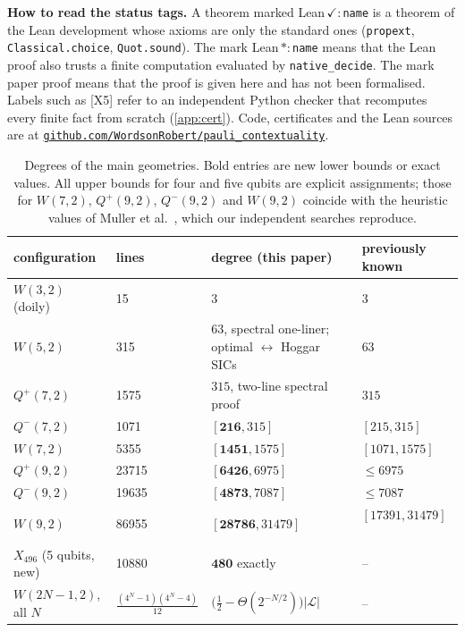 \documentclass[a4paper,onecolumn,11pt,unpublished,nopdfoutputerror]{quantumarticle}
\theoremstyle{definition}
\newcommand{\cert}[1]{\textcolor{certblue}{\textsf{[#1]}}}
\newcommand{\ding}{\ensuremath{\checkmark}}
\newcommand{\Lines}{\mathcal{L}}
\newcommand{\W}[1]{W(#1,2)}
\newcommand{\Qp}[1]{Q^{+}(#1,2)}
\newcommand{\Qm}[1]{Q^{-}(#1,2)}
\newcommand{\repourl}{https://github.com/WordsonRobert/pauli_contextuality}
\newcommand{\repo}{\href{\repourl}{\nolinkurl{github.com/WordsonRobert/pauli_contextuality}}}
\begin{document}
\begin{summarybox}
\textbf{How to read the status tags.} A theorem marked \textcolor{leangreen}{\textsf{Lean\,\ding:}\,\texttt{name}}
is a theorem of the Lean development whose axioms are only the standard ones (\texttt{propext},
\texttt{Classical.choice}, \texttt{Quot.sound}). The mark \textcolor{leangreen}{\textsf{Lean\,$\ast$:}\,\texttt{name}}
means that the Lean proof also trusts a finite computation evaluated by \texttt{native\_decide}. The mark
\textcolor{inkgray}{\textsf{paper proof}} means that the proof is given here and has not been formalised. Labels
such as \cert{X5} refer to an independent Python checker that recomputes every finite fact from scratch
(\cref{app:cert}). Code, certificates and the Lean sources are at \repo.
\end{summarybox}

\begin{table}[t]
\centering\small
\renewcommand{\arraystretch}{1.12}
\begin{tabular}{@{}llll@{}}
\toprule
configuration & lines & degree (this paper) & previously known\\\midrule
$\W3$ (doily) & 15 & $3$ & $3$~\cite{deBoutray2022}\\
$\W5$ & 315 & $63$, spectral one-liner; optimal $\leftrightarrow$ Hoggar SICs & $63$~\cite{Muller2024}\\
$\Qp7$ & 1575 & $315$, two-line spectral proof & $315$~\cite{LiGuptaGanesh2026}\\
$\Qm7$ & 1071 & $[\mathbf{216},315]$ & $[215,315]$~\cite{LiGuptaGanesh2026}\\
$\W7$ & 5355 & $[\mathbf{1451},1575]$ & $[1071,1575]$~\cite{Muller2024heur}\\
$\Qp9$ & 23715 & $[\mathbf{6426},6975]$ & $\le6975$~\cite{Muller2024heur}\\
$\Qm9$ & 19635 & $[\mathbf{4873},7087]$ & $\le7087$~\cite{Muller2024heur}\\
$\W9$ & 86955 & $[\mathbf{28786},31479]$ & $[17391,31479]$~\cite{Muller2024heur}\\
$X_{496}$ (5 qubits, new) & 10880 & $\mathbf{480}$ exactly & --\\
$\W{2N-1}$, all $N$ & $\tfrac{(4^N-1)(4^N-4)}{12}$ & $\bigl(\tfrac12-\Theta(2^{-N/2})\bigr)|\Lines|$ & --\\\bottomrule
\end{tabular}
\caption{Degrees of the main geometries. Bold entries are new lower bounds or exact values. All upper bounds for
four and five qubits are explicit assignments; those for $\W7$, $\Qp9$, $\Qm9$ and $\W9$ coincide with the
heuristic values of Muller et al.~\cite{Muller2024heur}, which our independent searches reproduce.}
\label{tab:headline}
\end{table}
\end{document}
